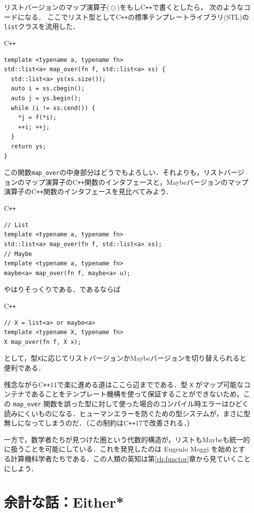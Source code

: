 \documentclass[a4paper]{jsbook}
\newcommand{\programminglanguage}[1]{\textsf{#1}}
\newcommand{\cxx}{\programminglanguage{C}\texttt{++}}
\newcommand{\cxxeleven}{\cxx\programminglanguage{11}}
\newcommand{\cxxseventeen}{\cxx\programminglanguage{17}}
\newcommand{\code}[1]{\texttt{#1}}
\newenvironment{cxxcode}{\begin{itembox}[r]{\cxx}}{\end{itembox}}
\DeclareMathOperator{\mMapList}{\odot}
\begin{document}
リストバージョンのマップ演算子($\mMapList$)をもし\cxx で書くとしたら，
次のようなコードになる．
ここでリスト型として\cxx の標準テンプレートライブラリ(STL)の
\code{list}クラスを流用した．
\begin{cxxcode}
\begin{verbatim}
template <typename a, typename fn>
std::list<a> map_over(fn f, std::list<a> xs) {
  std::list<a> ys(xs.size());
  auto i = xs.cbegin();
  auto j = ys.begin();
  while (i != xs.cend()) {
    *j = f(*i);
    ++i; ++j;
  }
  return ys;
}
\end{verbatim}
\end{cxxcode}
この関数\code{map\_over}の中身部分はどうでもよろしい．それよりも，リストバージョンのマップ演算子の\cxx 関数のインタフェースと，Maybeバージョンのマップ演算子の\cxx 関数のインタフェースを見比べてみよう．
\begin{cxxcode}
\begin{verbatim}
// List
template <typename a, typename fn>
std::list<a> map_over(fn f, std::list<a> xs);
// Maybe
template <typename a, typename fn>
maybe<a> map_over(fn f, maybe<a> u);
\end{verbatim}
\end{cxxcode}
やはりそっくりである．であるならば
\begin{cxxcode}
\begin{verbatim}
// X = list<a> or maybe<a>
template <typename X, typename fn>
X map_over(fn f, X x);
\end{verbatim}
\end{cxxcode}
として，型\code{X}に応じてリストバージョンかMaybeバージョンを切り替えられると便利である．

残念ながら\cxxeleven で楽に進める道はここら辺までである．型 \code{X} がマップ可能なコンテナであることをテンプレート機構を使って保証することができないため，この \code{map\_over} 関数を誤った型に対して使った場合のコンパイル時エラーはひどく読みにくいものになる．ヒューマンエラーを防ぐための型システムが，まさに型無しになってしまうのだ．（この制約は\cxxseventeen で改善される．）

一方で，数学者たちが見つけた圏という代数的構造が，リストもMaybeも統一的に扱うことを可能にしている．これを発見したのは Eugenio Moggi を始めとする計算機科学者たちである．この人類の英知は第\ref{ch:functor}章から見ていくことにしよう．


\section{余計な話：Either*}
\end{document}
